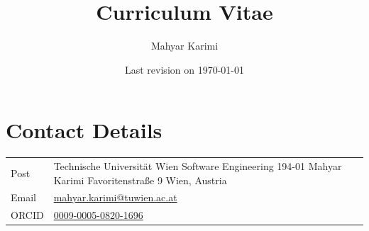 \documentclass[11pt]{article}
\title{\vspace{-2.0cm} \textbf{\LARGE Curriculum Vitae}}
\author{\Large Mahyar Karimi}
\date{Last revision on \today}
\begin{document}
\maketitle
\vspace{-1.0cm}
\section*{Contact Details}
\begin{tabular}{p{} p{}}
  Post &
    Technische Universit\"at Wien \newline
    Software Engineering 194-01 \newline
    Mahyar Karimi \newline
    Favoritenstra{\ss}e 9 \newline
    1040 Wien, Austria \vspace{0.25cm} \\
  Email &
    \href{mailto:mahyar.karimi@tuwien.ac.at}
    {mahyar.karimi@tuwien.ac.at} \vspace{0.25cm} \\
  ORCID &
    \href{https://orcid.org/0009-0005-0820-1696}
    {0009-0005-0820-1696}
\end{tabular}
\end{document}
